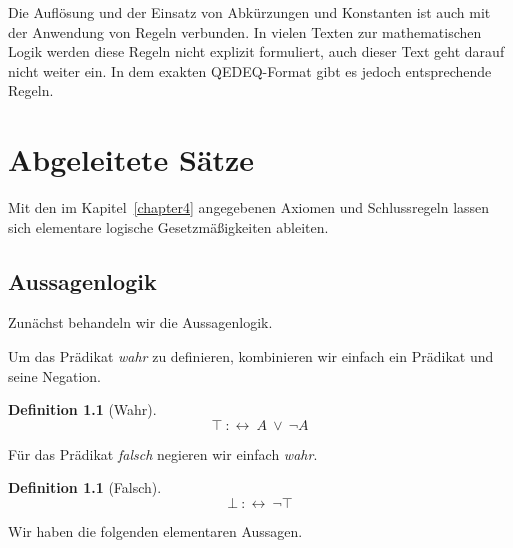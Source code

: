 \documentclass[a4paper,german,10pt,twoside]{book}
\theoremstyle{definition}
\newtheorem{defn}[thm]{Definition}
\theoremstyle{remark}
\begin{document}
Die Aufl{\"o}sung und der Einsatz von Abk{\"u}rzungen und Konstanten ist auch mit der Anwendung von Regeln verbunden. In vielen Texten zur mathematischen Logik werden diese Regeln nicht explizit formuliert, auch dieser Text geht darauf nicht weiter ein. In dem exakten QEDEQ-Format gibt es jedoch entsprechende Regeln.




\chapter{Abgeleitete S{\"a}tze} \label{chapter5} \hypertarget{chapter5}{}

Mit den im Kapitel~\ref{chapter4} angegebenen Axiomen und Schlussregeln lassen sich 
elementare logische Gesetzm{\"a}{\ss}igkeiten ableiten.

\section{Aussagenlogik} \label{chapter5_section0} \hypertarget{chapter5_section0}{}
Zun{\"a}chst behandeln wir die Aussagenlogik.

\par
Um das Pr{\"a}dikat \emph{wahr} zu definieren, kombinieren wir einfach ein Pr{\"a}dikat und
seine Negation.

\begin{defn}[Wahr]
\label{definition:True} \hypertarget{definition:True}{}
$$\top\ :\leftrightarrow \ A\ \lor \ \neg A$$

\end{defn}




\par
F{\"u}r das Pr{\"a}dikat \emph{falsch} negieren wir einfach \emph{wahr}.

\begin{defn}[Falsch]
\label{definition:False} \hypertarget{definition:False}{}
$$\bot\ :\leftrightarrow \ \neg \top$$

\end{defn}




\par
Wir haben die folgenden elementaren Aussagen.
\end{document}
